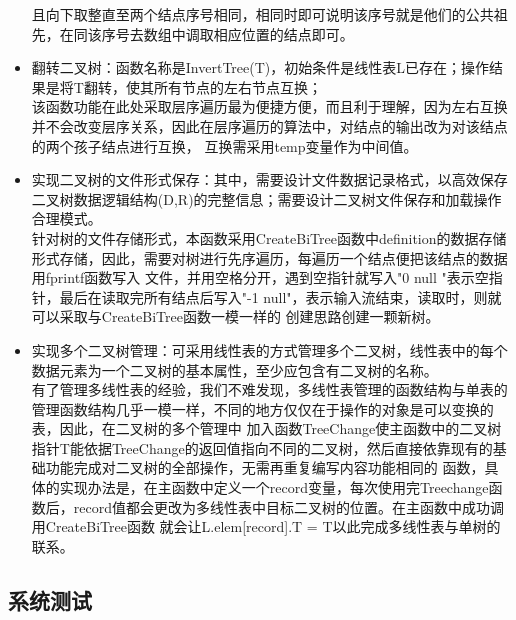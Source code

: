 \documentclass[supercite]{Experimental_Report}
\theoremstyle{definition}
\begin{document}
\begin{itemize}
	      且向下取整直至两个结点序号相同，相同时即可说明该序号就是他们的公共祖先，在同该序号去数组中调取相应位置的结点即可。
	\item 翻转二叉树：函数名称是InvertTree(T)，初始条件是线性表L已存在；操作结果是将T翻转，使其所有节点的左右节点互换；\\
	      该函数功能在此处采取层序遍历最为便捷方便，而且利于理解，因为左右互换并不会改变层序关系，因此在层序遍历的算法中，对结点的输出改为对该结点的两个孩子结点进行互换，
	      互换需采用temp变量作为中间值。
	\item 实现二叉树的文件形式保存：其中，需要设计文件数据记录格式，以高效保存二叉树数据逻辑结构(D,{R})的完整信息；需要设计二叉树文件保存和加载操作合理模式。\\
	      针对树的文件存储形式，本函数采用CreateBiTree函数中definition的数据存储形式存储，因此，需要对树进行先序遍历，每遍历一个结点便把该结点的数据用fprintf函数写入
	      文件，并用空格分开，遇到空指针就写入"0 null "表示空指针，最后在读取完所有结点后写入"-1 null"，表示输入流结束，读取时，则就可以采取与CreateBiTree函数一模一样的
	      创建思路创建一颗新树。
	\item 实现多个二叉树管理：可采用线性表的方式管理多个二叉树，线性表中的每个数据元素为一个二叉树的基本属性，至少应包含有二叉树的名称。\\
	      有了管理多线性表的经验，我们不难发现，多线性表管理的函数结构与单表的管理函数结构几乎一模一样，不同的地方仅仅在于操作的对象是可以变换的表，因此，在二叉树的多个管理中
	      加入函数TreeChange使主函数中的二叉树指针T能依据TreeChange的返回值指向不同的二叉树，然后直接依靠现有的基础功能完成对二叉树的全部操作，无需再重复编写内容功能相同的
	      函数，具体的实现办法是，在主函数中定义一个record变量，每次使用完Treechange函数后，record值都会更改为多线性表中目标二叉树的位置。在主函数中成功调用CreateBiTree函数
	      就会让L.elem[record].T = T以此完成多线性表与单树的联系。
\end{itemize}
\subsection{系统测试}
\end{document}
